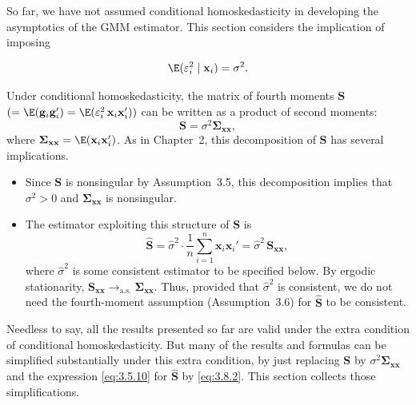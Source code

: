 
So far, we have not assumed conditional homoskedasticity in developing the asymptotics
of the GMM estimator.  This section considers the implication of imposing

\begin{assumption}
\label{ass:3.7}
\[
  \E(\varepsilon_i^2 \mid \mathbf{x}_i) = \sigma^2.
\]
\end{assumption}

Under conditional homoskedasticity, the matrix of fourth moments $\mathbf{S}$
$(= \E(\mathbf{g}_i \mathbf{g}_i') = \E(\varepsilon_i^2\, \mathbf{x}_i \mathbf{x}_i'))$ can be written as a
product of second moments:
\begin{equation}
  \mathbf{S} = \sigma^2 \boldsymbol{\Sigma}_{\mathbf{xx}},
  \label{eq:3.8.1}
\end{equation}
where $\boldsymbol{\Sigma}_{\mathbf{xx}} = \E(\mathbf{x}_i \mathbf{x}_i')$.  As in Chapter~2, this
decomposition of $\mathbf{S}$ has several implications.

\begin{itemize}
\item Since $\mathbf{S}$ is nonsingular by Assumption~3.5, this decomposition implies that
  $\sigma^2 > 0$ and $\boldsymbol{\Sigma}_{\mathbf{xx}}$ is nonsingular.

\item The estimator exploiting this structure of $\mathbf{S}$ is
  \begin{equation}
    \hat{\mathbf{S}} = \hat{\sigma}^2 \cdot \frac{1}{n} \sum_{i=1}^{n}
    \mathbf{x}_i \mathbf{x}_i' = \hat{\sigma}^2\, \mathbf{S}_{\mathbf{xx}},
    \label{eq:3.8.2}
  \end{equation}
  where $\hat{\sigma}^2$ is some consistent estimator to be specified below.  By ergodic stationarity,
  $\mathbf{S}_{\mathbf{xx}} \to_{\text{a.s.}} \boldsymbol{\Sigma}_{\mathbf{xx}}$.  Thus, provided that
  $\hat{\sigma}^2$ is consistent, we do not need the fourth-moment assumption (Assumption~3.6)
  for $\hat{\mathbf{S}}$ to be consistent.
\end{itemize}

Needless to say, all the results presented so far are valid under the extra
condition of conditional homoskedasticity.  But many of the results and formulas
can be simplified substantially under this extra condition, by just replacing $\mathbf{S}$
by $\sigma^2 \boldsymbol{\Sigma}_{\mathbf{xx}}$ and the expression \eqref{eq:3.5.10} for
$\hat{\mathbf{S}}$ by \eqref{eq:3.8.2}.  This section collects those simplifications.

